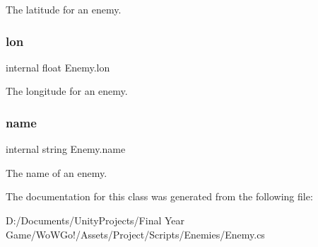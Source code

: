 The latitude for an enemy. 

\mbox{\label{class_enemy_a8ae77cbcd385c768eb0649a31718a08e}} 
\subsubsection{\texorpdfstring{lon}{lon}}
{\footnotesize\ttfamily internal float Enemy.\+lon\hspace{0.3cm}{\ttfamily [private]}}



The longitude for an enemy. 

\mbox{\label{class_enemy_a76e75afdb1a83151f0b816c375995b64}} 
\subsubsection{\texorpdfstring{name}{name}}
{\footnotesize\ttfamily internal string Enemy.\+name\hspace{0.3cm}{\ttfamily [private]}}



The name of an enemy. 



The documentation for this class was generated from the following file\+:\begin{DoxyCompactItemize}
\item 
D\+:/\+Documents/\+Unity\+Projects/\+Final Year Game/\+Wo\+W\+Go!/\+Assets/\+Project/\+Scripts/\+Enemies/Enemy.\+cs\end{DoxyCompactItemize}
